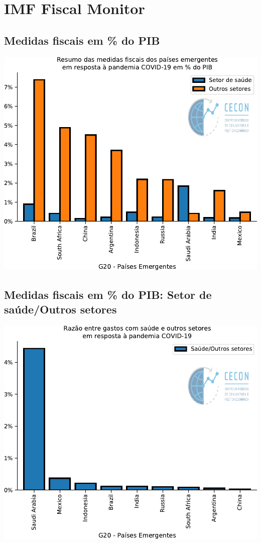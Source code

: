 \documentclass{SelfArx}
\begin{document}
\section*{IMF Fiscal Monitor}
\label{sec:orgab1d970}
\subsection*{Medidas fiscais em \% do PIB}
\label{sec:org16a9918}

\begin{center}
\includegraphics[width=.9\linewidth]{./figs/IMF/FiscalMonitor_Covid.pdf}
\end{center}

\subsection*{Medidas fiscais em \% do PIB: Setor de saúde/Outros setores}
\label{sec:orgda933fd}

\begin{center}
\includegraphics[width=.9\linewidth]{./figs/IMF/FiscalMonitor_Covid_ratio.pdf}
\end{center}
\end{document}
